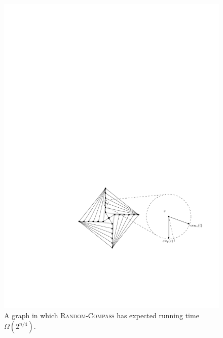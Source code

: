 \documentclass{elsarticle}
\begin{document}
\begin{figure}
  \begin{center}
    \includegraphics{pics/bad-unbiased}
  \end{center}
  \caption{A graph in which \textsc{Random-Compass} has expected running time 
           $\Omega(2^{n/4})$.}
  \label{fig:bad-unbiased}
\end{figure}
\end{document}
